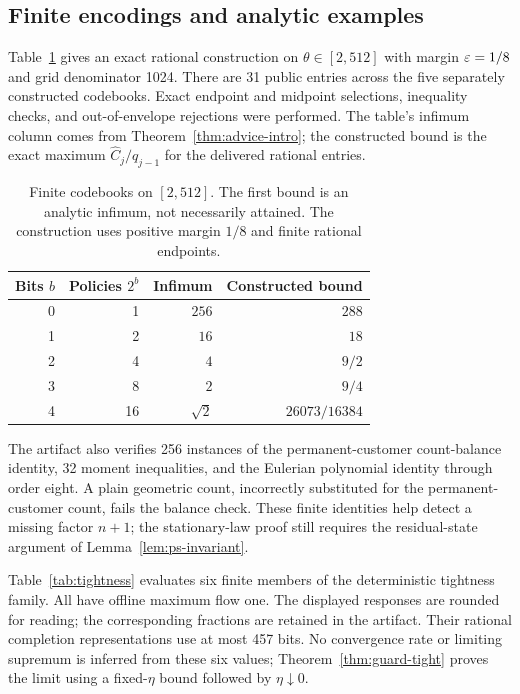 \subsection{Finite encodings and analytic examples}
Table~\ref{tab:advice} gives an exact rational construction on $\theta\in[2,512]$ with margin $\varepsilon=1/8$ and grid denominator 1024. There are 31 public entries across the five separately constructed codebooks. Exact endpoint and midpoint selections, inequality checks, and out-of-envelope rejections were performed. The table's infimum column comes from Theorem~\ref{thm:advice-intro}; the constructed bound is the exact maximum $\widehat C_j/q_{j-1}$ for the delivered rational entries.

\begin{table}[t]
\centering
\caption{Finite codebooks on $[2,512]$. The first bound is an analytic infimum, not necessarily attained. The construction uses positive margin $1/8$ and finite rational endpoints.}\label{tab:advice}
\begin{tabular}{rrrr}
\toprule
Bits $b$ & Policies $2^b$ & Infimum & Constructed bound\\
\midrule
0 & 1 & $256$ & $288$\\
1 & 2 & $16$ & $18$\\
2 & 4 & $4$ & $9/2$\\
3 & 8 & $2$ & $9/4$\\
4 & 16 & $\sqrt{2}$ & $26073/16384$\\
\bottomrule
\end{tabular}
\end{table}

The artifact also verifies 256 instances of the permanent-customer count-balance identity, 32 moment inequalities, and the Eulerian polynomial identity through order eight. A plain geometric count, incorrectly substituted for the permanent-customer count, fails the balance check. These finite identities help detect a missing factor $n+1$; the stationary-law proof still requires the residual-state argument of Lemma~\ref{lem:ps-invariant}.

Table~\ref{tab:tightness} evaluates six finite members of the deterministic tightness family. All have offline maximum flow one. The displayed responses are rounded for reading; the corresponding fractions are retained in the artifact. Their rational completion representations use at most 457 bits. No convergence rate or limiting supremum is inferred from these six values; Theorem~\ref{thm:guard-tight} proves the limit using a fixed-$\eta$ bound followed by $\eta\downarrow0$.

